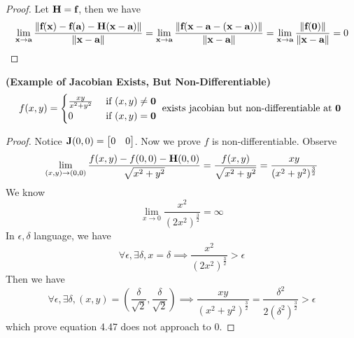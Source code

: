 \documentclass{report}
\begin{document}
\begin{proof}
Let $\textbf{H}=\textbf{f}$, then we have 
\begin{equation}
  \lim_{\textbf{x}\to \textbf{a}}\frac{\| \textbf{f}(\textbf{x})-\textbf{f}(\textbf{a})-\textbf{H}(\textbf{x}-\textbf{a}) \|}{\| \textbf{x}-\textbf{a} \|}=\lim_{\textbf{x}\to \textbf{a}}\frac{\| \textbf{f}(\textbf{x}-\textbf{a}-(\textbf{x}-\textbf{a})) \|}{\| \textbf{x}-\textbf{a} \|}=\lim_{\textbf{x}\to \textbf{a}}\frac{\| \textbf{f}(\textbf{0}) \|}{\| \textbf{x}-\textbf{a} \|}=0
\end{equation}
\end{proof}
\begin{theorem}
\label{4.3.3}
\textbf{(Example of Jacobian Exists, But Non-Differentiable)} 
\begin{equation}
f(x,y)=\begin{cases}
  \frac{xy}{x^2+y^2}& \text{ if  }(x,y)\neq \textbf{0}\\
  0& \text{ if  }(x,y)=\textbf{0}
\end{cases}\text{ exists jacobian but non-differentiable at $\textbf{0}$  }
\end{equation}
\end{theorem}
\begin{proof}
Notice $\textbf{J}(0,0)=\begin{bmatrix}
  0&0
\end{bmatrix}$. Now we prove $f$ is non-differentiable. Observe
\begin{equation}
\lim_{(x,y)\to (0,0)}\frac{f(x,y)-f(0,0)-\textbf{H}(0,0)}{\sqrt{x^2+y^2} }=\frac{f(x,y)}{\sqrt{x^2+y^2} }=\frac{xy}{(x^2+y^2)^{\frac{3}{2}}}
\end{equation}
We know 
\begin{equation}
\lim_{x\to 0}\frac{x^2}{(2x^2)^{\frac{3}{2}}}=\infty
\end{equation}
In $\epsilon,\delta$ language, we have
\begin{equation}
\forall \epsilon, \exists \delta, x=\delta\implies  \frac{x^2}{(2x^2)^{\frac{3}{2}}}>\epsilon 
\end{equation}
Then we have 
\begin{equation}
  \forall \epsilon ,\exists \delta, (x,y)=(\frac{\delta}{\sqrt{2}},\frac{\delta}{\sqrt{2}}) \implies \frac{xy}{(x^2+y^2)^{\frac{3}{2}}}=\frac{\delta^2}{2(\delta^2)^{\frac{3}{2}}}>\epsilon 
\end{equation}
which prove  equation 4.47 does not approach to 0.
\end{proof}
\end{document}
